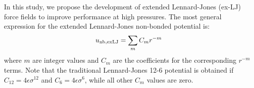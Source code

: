 \documentclass[11pt,a4paper]{article}
\begin{document}






In this study, we propose the development of extended Lennard-Jones (ex-LJ) force fields to improve performance at high pressures. The most general expression for the extended Lennard-Jones non-bonded potential is:
\begin{equation} \label{ex-LJ general}
u_{\rm nb, exLJ} = \sum_m C_m r^{-m} 
\end{equation} 
where $m$ are integer values and $C_m$ are the coefficients for the corresponding $r^{-m}$ terms. Note that the traditional Lennard-Jones 12-6 potential is obtained if $C_{12} = 4\epsilon\sigma^{12}$ and $C_6=4\epsilon\sigma^{6}$, while all other $C_m$ values are zero. 
\end{document}
